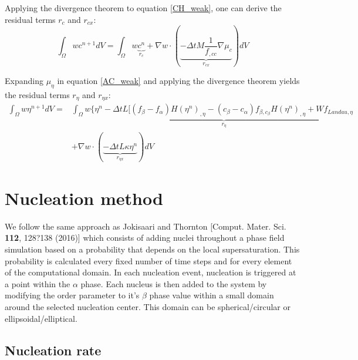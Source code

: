 \documentclass[11pt]{article}
\renewcommand{\=}[1]{\stackrel{#1}{=}} %
\theoremstyle{definition}
\theoremstyle{remark}
\begin{document}
Applying the divergence theorem to equation \ref{CH_weak}, one can derive the residual terms $r_c$ and $r_{cx}$:
\begin{equation}
\int_\Omega w c^{n+1} dV = \int_\Omega w\underbrace{c^{n}}_{r_c}+\nabla w \cdot (\underbrace{-\Delta t  M \frac{1}{f_{,cc}} \nabla \mu_c}_{r_{cx}} ) dV
\end{equation}

Expanding $\mu_{\eta}$ in equation \ref{AC_weak} and applying the divergence theorem yields the residual terms $r_{\eta}$ and $r_{\eta x}$:
\begin{equation}
\begin{split}
\int_\Omega w \eta^{n+1} dV = &\int_\Omega w \Bigg\{\underbrace{\eta^{n}-\Delta t L \bigg[(f_{\beta}-f_{\alpha})H(\eta^n)_{,\eta} -(c_{\beta}-c_{\alpha}) f_{\beta,c_{\beta}}H(\eta^n)_{,\eta} + W f_{Landau,\eta}}_{r_{\eta}}\\ 
&+ \nabla w \cdot (\underbrace{-\Delta t  L \kappa \eta^n}_{r_{\eta x}} ) dV 
\end{split}
\end{equation}

\section{Nucleation method}

We follow the same approach as Jokisaari and Thornton [Comput. Mater. Sci. {\bf 112}, 128?138 (2016)] which consists of adding nuclei throughout a phase field simulation based on a probability that depends on the local supersaturation. This probability is calculated every fixed number of time steps and for every element of the computational domain. In each nucleation event, nucleation is triggered at a point within the $\alpha$ phase. Each nucleus is then added to the system by modifying the order parameter to it's $\beta$ phase value within a small domain around the selected nucleation center. This domain can be spherical/circular or ellipsoidal/elliptical.  

\subsection{Nucleation rate}
\end{document}
